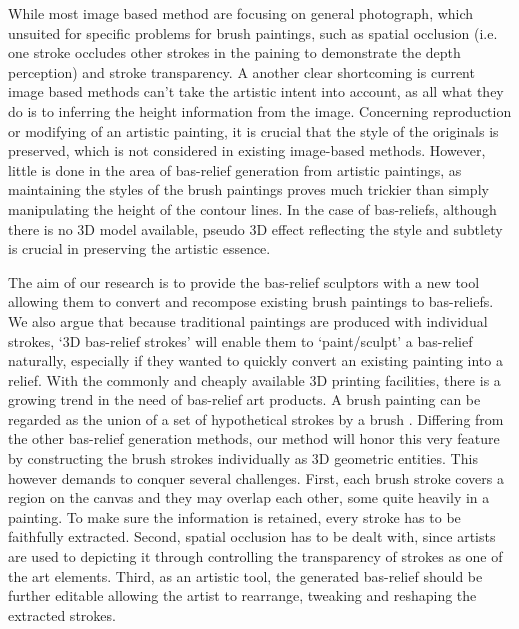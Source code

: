 While most image based method are focusing on general photograph, which unsuited for specific problems for brush paintings, such as spatial occlusion (i.e. one stroke occludes other strokes in the paining to demonstrate the depth perception) and stroke transparency. A another clear shortcoming is current image based methods can’t take the artistic intent into account, as all what they do is to inferring the height information from the image. Concerning reproduction or modifying of an artistic painting, it is crucial that the style of the originals is preserved, which is not considered in existing image-based methods. However, little is done in the area of bas-relief generation from artistic paintings, as maintaining the styles of the brush paintings proves much trickier than simply manipulating the height of the contour lines. In the case of bas-reliefs, although there is no 3D model available, pseudo 3D effect reflecting the style and subtlety is crucial in preserving the artistic essence.

The aim of our research is to provide the bas-relief sculptors with a new tool allowing them to convert and recompose existing brush paintings to bas-reliefs. We also argue that because traditional paintings are produced with individual strokes, ‘3D bas-relief strokes’ will enable them to ‘paint/sculpt’ a bas-relief naturally, especially if they wanted to quickly convert an existing painting into a relief. With the commonly and cheaply available 3D printing facilities, there is a growing trend in the need of bas-relief art products.
A brush painting can be regarded as the union of a set of hypothetical strokes by a brush \cite{xu2006animating}. Differing from the other bas-relief generation methods, our method will honor this very feature by constructing the brush strokes individually as 3D geometric entities. This however demands to conquer several challenges. First, each brush stroke covers a region on the canvas and they may overlap each other, some quite heavily in a painting. To make sure the information is retained, every stroke has to be faithfully extracted. Second, spatial occlusion has to be dealt with, since artists are used to depicting it through controlling the transparency of strokes as one of the art elements. Third, as an artistic tool, the generated bas-relief should be further editable allowing the artist to rearrange, tweaking and reshaping the extracted strokes.

